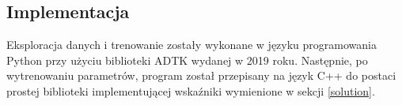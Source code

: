 \subsection{Implementacja}
Eksploracja danych i trenowanie zostały wykonane w języku programowania Python przy użyciu biblioteki ADTK
\cite{ADTK} wydanej w 2019 roku. Następnie, po wytrenowaniu parametrów, program został przepisany na język C++ do
postaci prostej biblioteki implementującej wskaźniki wymienione w sekcji \ref{solution}.
\printbibliography